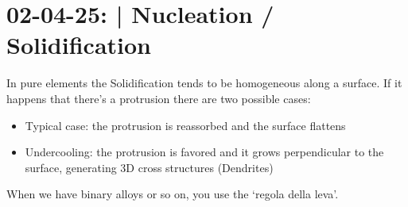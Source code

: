 \section{02-04-25: | Nucleation / Solidification}

In pure elements the Solidification tends to be homogeneous along a surface. If it happens that there's a protrusion there are two possible cases:
\begin{itemize}
    \item Typical case: the protrusion is reassorbed and the surface flattens
    \item Undercooling: the protrusion is favored and it grows perpendicular to the surface, generating 3D cross structures (Dendrites)
\end{itemize}
When we have binary alloys or so on, you use the `regola della leva'.